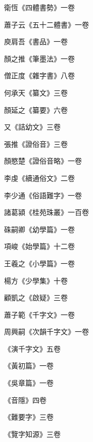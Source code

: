 \begin{pinyinscope}
 衛恆《四體書勢》一卷



 蕭子云《五十二體書》一卷



 庾肩吾《書品》一卷



 顏之推《筆墨法》一卷



 僧正度《雜字書》八卷



 何承天《纂文》三卷



 顏延之《纂要》六卷



 又《詰幼文》三卷



 張推《證俗音》三卷



 顏愍楚《證俗音略》一卷



 李虔《續通俗文》二卷



 李少通《俗語難字》一卷



 諸葛潁《桂苑珠叢》一百卷



 硃嗣卿《幼學篇》一卷



 項峻《始學篇》十二卷



 王羲之《小學篇》一卷



 楊方《少學集》十卷



 顧凱之《啟疑》三卷



 蕭子範《千字文》一卷



 周興嗣《次韻千字文》一卷



 《演千字文》五卷



 《黃初篇》一卷



 《吳章篇》一卷



 《音隱》四卷



 《難要字》三卷



 《覽字知源》三卷




\end{pinyinscope}
